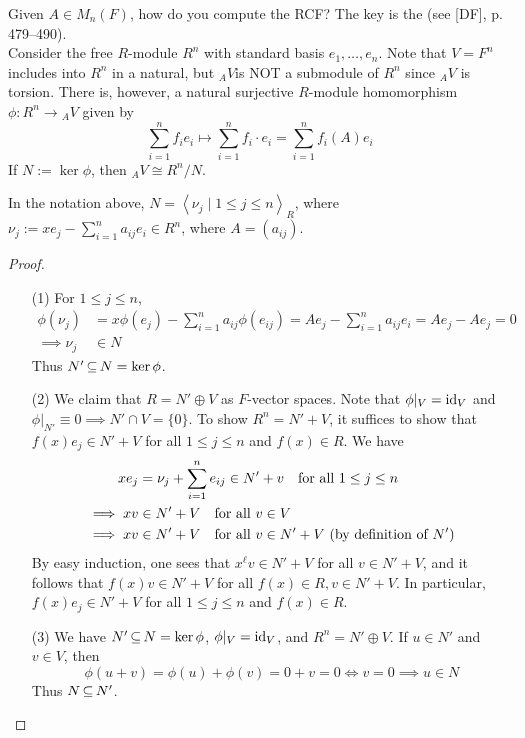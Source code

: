 \documentclass[11pt]{book}
\theoremstyle{definition}   \newtheorem{defn}[counter]{Definition} %
\newcommand{\gen}[1]{\left\langle #1 \right\rangle}   \newcommand{\stab}[2]{\tn{Stab}_{#1}(#2)}   \newcommand{\fix}[2]{\tn{Fix}_{#1}(#2)}   \newcommand{\op}{^{\tn{op}}}
\DeclareMathOperator{\ra}{\rightarrow}   \DeclareMathOperator{\Poly}{\mathbf{P}}   \DeclareMathOperator{\spn}{\textnormal{span}}   \DeclareMathOperator{\aut}{\textnormal{Aut}}
\numberwithin{counter}{chapter}
\begin{document}
\noindent {} Given $A \in M_n(F)$, how do you compute the RCF? The key is the  (see [DF], p. 479--490). \\

Consider the free $R$-module $R^n$ with standard basis $e_1,\dots,e_n$. Note that $V = F^n$ includes into $R^n$ in a natural, but ${_AV}$is NOT a submodule of $R^n$ since ${_AV}$ is torsion. There is, however, a natural surjective $R$-module homomorphism $\phi : R^n \ra {_AV}$ given by
	\[\sum_{i=1}^n f_i e_i \mapsto \sum_{i=1}^n f_i \cdot e_i = \sum_{i=1}^n f_i(A) e_i \]
If $N := \ker \phi$, then ${_AV} \cong R^n/N$.

\begin{lemma}[Exercises 22--25 on p. 491 in {[DF]} ]
In the notation above, $N = \gen{\nu_j \mid 1 \leq j \leq n}_R$, where $\nu_j := xe_j - \sum_{i=1}^n a_{ij} e_i \in R^n$, where $A = (a_{ij})$.
\end{lemma}

\begin{proof}\
\begin{enumerate}
\item[(1)] For $1 \leq j \leq n$,
	\begin{align*}
	\phi(\nu_j) &= x \phi(e_j) - \sum_{i=1}^n a_{ij} \phi(e_{ij}) = Ae_j - \sum_{i=1}^n a_{ij} e_i = Ae_j - Ae_j = 0 \\
	\implies \nu_j &\in N
	\end{align*}
Thus $N' \operatorname{\subseteq} N = \ker \phi$.
\item[(2)] We claim that $R = N' \oplus V$ as $F$-vector spaces. Note that $\phi|_V = \textnormal{id}_V$ and $\phi|_{N'} \equiv 0 \implies N' \cap V = \{0\}$. To show $R^n = N' + V$, it suffices to show that $f(x) e_j \in N' + V$ for all $1 \leq j \leq n$ and $f(x) \in R$. We have
\begin{align*}
x e_j &= \nu_j + \sum_{i=1}^n e_{ij} \in N' + v \quad \textnormal{for all } 1 \leq j \leq n \\
\implies x v &\in N' + V \quad \textnormal{for all } v \in V \\
\implies xv &\in N' + V \quad \textnormal{for all } v \in N' + V \textnormal{ (by definition of $N'$)}
\end{align*}
By easy induction, one sees that $x^\ell v \in N' + V$ for all $v \in N' + V$, and it follows that $f(x) v \in N' + V$ for all $f(x) \in R, v \in N' + V$. In particular, $f(x) e_j \in N' + V$ for all $1 \leq j \leq n$ and $f(x) \in R$.

\item[(3)] We have $N' \operatorname{\subseteq} N = \ker \phi$, $\phi|_V = \textnormal{id}_V$, and $R^n = N' \oplus V$. If $u \in N'$ and $v \in V$, then
	\[\phi(u + v) = \phi(u) + \phi(v) = 0 + v = 0 \iff v = 0 \implies u \in N \]
Thus $N \operatorname{\subseteq} N'$.
\end{enumerate}
\end{proof}
\end{document}
